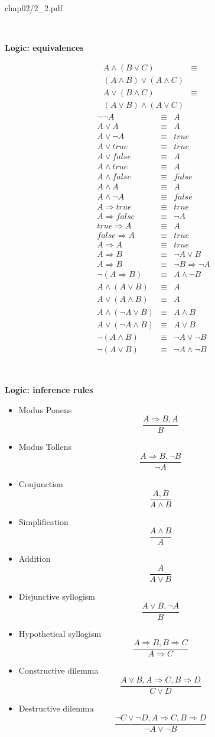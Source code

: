 \documentclass{article}
\newcommand{\myfig}[1]{\begin{overpic}[scale=1.5]{#1}}
\newcommand{\myfigend}{\end{overpic}\newpage}
\newcommand{\bi}{\begin{itemize}}
\newcommand{\ii}{\item}
\newcommand{\ei}{\end{itemize}}
\newcommand{\ti}[1]{
\mbox{~}

\vspace{1.25in}
\centerline{\bf #1}}
\begin{document}
\newpage
\myfig{chap02/2_2.pdf}
\myfigend

\ti{Logic: equivalences}
\newcommand{\eq}{&\equiv&}
\newcommand{\imp}{\Rightarrow}

\begin{multicols}{2}
\begin{eqnarray*}
A\land(B\lor C) \eq\\  (A\land B) \lor (A \land C)\\
A\lor(B\land C) \eq\\  (A\lor B) \land (A \lor C)
\end{eqnarray*}
\begin{eqnarray*}
\neg \neg A \eq A\\
A\lor A \eq A\\
A\lor \neg A \eq true\\
A\lor true \eq true\\
A\lor false \eq A\\
A\land true \eq A\\
A\land false \eq false\\
A\land A \eq A\\
A\land \neg A \eq false\\
A\imp true \eq true\\
A\imp false \eq \neg A\\
true\imp A \eq A\\
false \imp A \eq true\\
A\imp A \eq true\\
A\imp B \eq \neg A \lor B\\
A\imp B \eq \neg B \imp \neg A\\
\neg(A\imp B) \eq A \land \neg B\\
A\land(A\lor B) \eq A\\
A\lor(A\land B) \eq A\\
A\land(\neg A \lor B) \eq A \land B\\
A \lor (\neg A \land B) \eq A \lor B\\
\neg(A\land B) \eq \neg A \lor \neg B\\
\neg(A\lor B) \eq \neg A \land \neg B
\end{eqnarray*}

\end{multicols}

\newpage
\ti{Logic: inference rules}
\begin{multicols}{2}
\bi
\ii Modus Ponens
\[
\frac{A\imp B, A}{B}
\]
\ii Modus Tollens
\[
\frac{A\imp B, \neg B}{\neg A}
\]
\ii Conjunction
\[
\frac{A,B}{A\land B}
\]
\ii Simplification
\[
\frac{A\land B}{A}
\]
\ii Addition
\[
\frac{A}{A\lor B}
\]
\ii Disjunctive syllogism
\[
\frac{A\lor B, \neg A}{B}
\]
\ii Hypothetical syllogism
\[
\frac{A\imp B, B\imp C}{A\imp C}
\]
\ii Constructive dilemma
\[
\frac{A\lor B, A\imp C, B\imp D}{C\lor D}
\]
\ii Destructive dilemma
\[
\frac{\neg C\lor \neg D, A\imp C, B\imp D}{\neg A \lor \neg B}
\]
\ei
\end{multicols}
\end{document}
